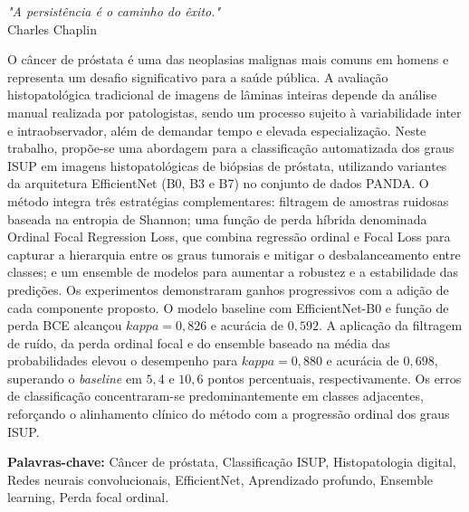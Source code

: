 \documentclass[
12pt,				%
oneside,			%
a4paper,			%
english,			%
french,				%
spanish,			%
brazil				%
]{abntex2}
\begin{document}
		
		\newpage
		\begin{epigrafe}
			\vspace*{\fill}
			\begin{flushright}
				\textit{"A persistência é o caminho do êxito."} \\
				Charles Chaplin				
			\end{flushright}
			\vspace{2,5cm}
		\end{epigrafe}
		
		
		
		\setlength{\absparsep}{18pt} %
		
		\begin{resumo}
			
			O câncer de próstata é uma das neoplasias malignas mais comuns em homens e representa um desafio significativo para a saúde pública. A avaliação histopatológica tradicional de imagens de lâminas inteiras depende da análise manual realizada por patologistas, sendo um processo sujeito à variabilidade inter e intraobservador, além de demandar tempo e elevada especialização. Neste trabalho, propõe-se uma abordagem para a classificação automatizada dos graus ISUP
			em imagens histopatológicas de biópsias de próstata, utilizando variantes da arquitetura EfficientNet (B0, B3 e B7) no conjunto de dados PANDA. O método integra três estratégias complementares: filtragem de amostras ruidosas baseada na entropia de Shannon; uma função de perda híbrida denominada Ordinal Focal Regression Loss, que combina regressão ordinal e Focal Loss para capturar a hierarquia entre os graus tumorais e mitigar o desbalanceamento entre classes; e um ensemble de modelos para aumentar a robustez e a estabilidade das predições. Os experimentos demonstraram ganhos progressivos com a adição de cada componente proposto. O modelo baseline com EfficientNet-B0 e função de perda BCE alcançou $kappa = 0{,}826$ e acurácia de $0{,}592$. A aplicação da filtragem de ruído, da perda ordinal focal e do ensemble baseado na média das probabilidades elevou o desempenho para $kappa = 0{,}880$ e acurácia de
			$0{,}698$, superando o \textit{baseline} em $5{,}4$ e $10{,}6$ pontos percentuais, respectivamente. Os erros de classificação concentraram-se predominantemente em classes adjacentes, reforçando o alinhamento clínico do método com a progressão ordinal dos graus ISUP.
			
			\textbf{Palavras-chave:} Câncer de próstata, Classificação ISUP, Histopatologia digital, Redes neurais convolucionais, EfficientNet, Aprendizado profundo, Ensemble learning, Perda focal ordinal.
		\end{resumo}
		
\end{document}
